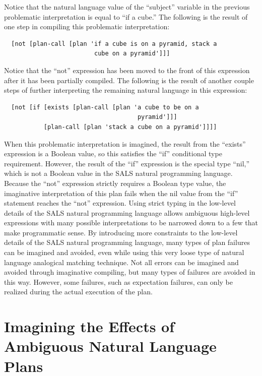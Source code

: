 Notice that the natural language value of the ``subject'' variable in
the previous problematic interpretation is equal to ``if a cube.''
The following is the result of one step in compiling this problematic
interpretation:
\begin{Verbatim}
  [not [plan-call [plan 'if a cube is on a pyramid, stack a
                         cube on a pyramid']]]
\end{Verbatim}
Notice that the ``not'' expression has been moved to the
front of this expression after it has been partially compiled.  The
following is the result of another couple steps of further
interpreting the remaining natural language in this expression:
\begin{Verbatim}
  [not [if [exists [plan-call [plan 'a cube to be on a
                                     pyramid']]]
           [plan-call [plan 'stack a cube on a pyramid']]]]
\end{Verbatim}
When this problematic interpretation is imagined, the result from the
``exists'' expression is a Boolean value, so this satisfies the ``if''
conditional type requirement.  However, the result of the ``if''
expression is the special type ``nil,'' which is not a Boolean value
in the SALS natural programming language.  Because the ``not''
expression strictly requires a Boolean type value, the imaginative
interpretation of this plan fails when the nil value from the ``if''
statement reaches the ``not'' expression.  Using strict typing in the
low-level details of the SALS natural programming language allows
ambiguous high-level expressions with many possible interpretations to
be narrowed down to a few that make programmatic sense.  By
introducing more constraints to the low-level details of the SALS
natural programming language, many types of plan failures can be
imagined and avoided, even while using this very loose type of natural
language analogical matching technique.  Not all errors can be
imagined and avoided through imaginative compiling, but many types of
failures are avoided in this way.  However, some failures, such as
expectation failures, can only be realized during the actual execution
of the plan.

\section{Imagining the Effects of Ambiguous Natural Language Plans}

